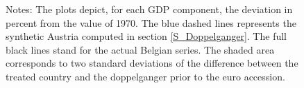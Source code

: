 \documentclass[12pt]{article}
\newcommand{\annote}[1]{\parbox{\textwidth}{\renewcommand{\baselinestretch}{1.0}\vspace{12pt} \small Notes: #1}}
\begin{document}
\begin{figure}[h!]
    \annote{The plots depict, for each GDP component, the deviation in percent from the value of 1970. The blue dashed lines represents the synthetic Austria computed in section \ref{S_Doppelganger}. The full black lines stand for the actual Belgian series. The shaded area corresponds to two standard deviations of the difference between the treated country and the doppelganger prior to the euro accession. }
\end{figure}
\end{document}
